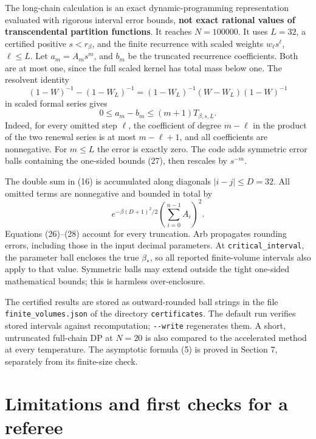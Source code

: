 \documentclass[11pt,a4paper]{report}
\begin{document}
The long-chain calculation is an exact dynamic-programming representation evaluated with rigorous interval error bounds, \textbf{not exact rational values of transcendental partition functions}. It reaches \(N=100000\). It uses \(L=32\), a certified positive \(s<r_\beta\), and the finite recurrence with scaled weights \(w_\ell s^\ell\), \(\ell\leq L\). Let \(a_m=A_m s^m\), and \(b_m\) be the truncated recurrence coefficients. Both are at most one, since the full scaled kernel has total mass below one. The resolvent identity
\[(1-W)^{-1}-(1-W_L)^{-1}
 =(1-W_L)^{-1}(W-W_L)(1-W)^{-1}\]
in scaled formal series gives
\[0\leq a_m-b_m\leq(m+1)T_{\beta,s,L}.
 \tag{27}\]
Indeed, for every omitted step \(\ell\), the coefficient of degree \(m-\ell\) in the product of the two renewal series is at most \(m-\ell+1\), and all coefficients are nonnegative. For \(m\leq L\) the error is exactly zero. The code adds symmetric error balls containing the one-sided bounds (27), then rescales by \(s^{-m}\).

The double sum in (16) is accumulated along diagonals \(|i-j|\leq D=32\). All omitted terms are nonnegative and bounded in total by
\[e^{-\beta(D+1)^2/2}\left(\sum_{i=0}^{n-1}A_i\right)^2.
 \tag{28}\]
Equations (26)--(28) account for every truncation. Arb propagates rounding errors, including those in the input decimal parameters. At \texttt{critical\_interval}, the parameter ball encloses the true \(\beta_*\), so all reported finite-volume intervals also apply to that value. Symmetric balls may extend outside the tight one-sided mathematical bounds; this is harmless over-enclosure.

The certified results are stored as outward-rounded ball strings in the file \texttt{finite\_volumes.json} of the directory \texttt{certificates}. The default run verifies stored intervals against recomputation; \texttt{-\/-write} regenerates them. A short, untruncated full-chain DP at \(N=20\) is also compared to the accelerated method at every temperature. The asymptotic formula (5) is proved in Section 7, separately from its finite-size check.

\section{Limitations and first checks for a referee}
\end{document}
